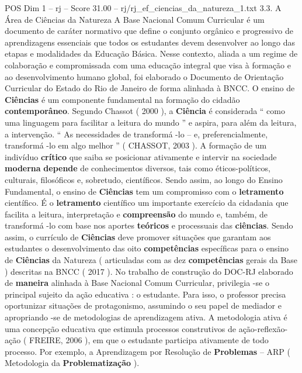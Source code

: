\begin{textsample}{POS Dim 1 – rj – Score 31.00 – rj/rj\_ef\_ciencias\_da\_natureza\_1.txt}  \label{ex:f1_pos_279}
3.3.
A Área de Ciências da Natureza A Base Nacional Comum Curricular é um documento de caráter normativo que define o conjunto orgânico e progressivo de aprendizagens essenciais que todos os estudantes devem desenvolver ao longo das etapas e modalidades da Educação Básica.
Nesse contexto, aliada a um regime de colaboração e compromissada com uma educação integral que visa à formação e ao desenvolvimento humano global, foi elaborado o Documento de Orientação Curricular do Estado do Rio de Janeiro de forma alinhada à BNCC.
O ensino de \textbf{Ciências} é um componente fundamental na formação do cidadão \textbf{contemporâneo}.
Segundo Chassot ( 2000 ), a \textbf{Ciência} é considerada “ como uma linguagem para facilitar a leitura do mundo ” e aspira, para além da leitura, a intervenção. “ As necessidades de transformá -lo – e, preferencialmente, transformá -lo em algo melhor ” ( CHASSOT, 2003 ).
A formação de um indivíduo \textbf{crítico} que saiba se posicionar ativamente e intervir na sociedade \textbf{moderna} \textbf{depende} de conhecimentos diversos, tais como éticos-políticos, culturais, filosóficos e, sobretudo, científicos.
Sendo assim, ao longo do Ensino Fundamental, o ensino de \textbf{Ciências} tem um compromisso com o \textbf{letramento} científico.
É o \textbf{letramento} científico um importante exercício da cidadania que facilita a leitura, interpretação e \textbf{compreensão} do mundo e, também, de transformá -lo com base nos aportes \textbf{teóricos} e processuais das \textbf{ciências}.
Sendo assim, o currículo de \textbf{Ciências} deve promover situações que garantam aos estudantes o desenvolvimento das oito \textbf{competências} específicas para o ensino de \textbf{Ciências} da Natureza ( articuladas com as dez \textbf{competências} gerais da Base ) descritas na BNCC ( 2017 ).
No trabalho de construção do DOC-RJ elaborado de \textbf{maneira} alinhada à Base Nacional Comum Curricular, privilegia -se o principal sujeito da ação educativa : o estudante.
Para isso, o professor precisa oportunizar situações de protagonismo, assumindo o seu papel de mediador e apropriando -se de metodologias de aprendizagem ativa.
A metodologia ativa é uma concepção educativa que estimula processos construtivos de ação-reflexão-ação ( FREIRE, 2006 ), em que o estudante participa ativamente de todo processo.
Por exemplo, a Aprendizagem por Resolução de \textbf{Problemas} – ARP ( Metodologia da \textbf{Problematização} ).

\end{textsample}
